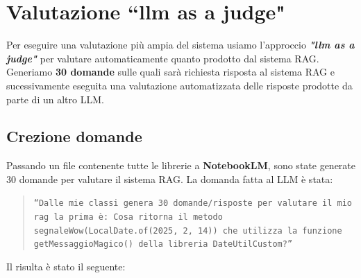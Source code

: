 \documentclass[12pt,a4paper,openright,twoside]{book}
\begin{document}
\section{Valutazione ``llm as a judge"}
Per eseguire una valutazione più ampia del sistema usiamo l'approccio \textbf{\emph{"llm as a judge"}} per valutare automaticamente quanto prodotto dal sistema RAG.
Generiamo \textbf{30 domande} sulle quali sarà richiesta risposta al sistema RAG e sucessivamente eseguita una valutazione automatizzata delle risposte prodotte da parte di un altro LLM.
\subsection{Crezione domande}
Passando un file contenente tutte le librerie a \textbf{NotebookLM}, sono state generate 30 domande per valutare il sistema RAG.
La domanda fatta al LLM è stata:
\begin{quote}
    \texttt{``Dalle mie classi genera 30 domande/risposte per valutare il mio rag la prima è:
    \newline Cosa ritorna il metodo segnaleWow(LocalDate.of(2025, 2, 14))
    che utilizza la funzione getMessaggioMagico() della libreria
    DateUtilCustom?''}
\end{quote}
Il risulta è stato il seguente:
\end{document}
